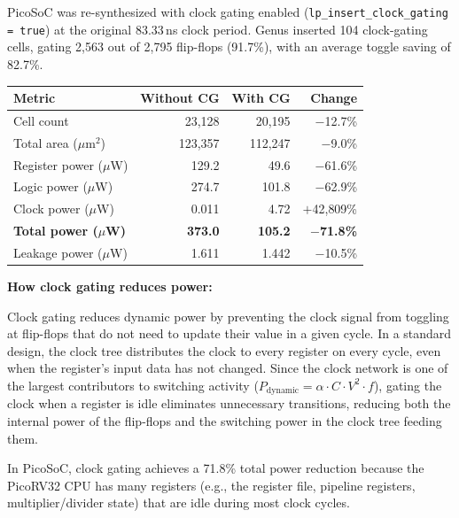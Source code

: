 \documentclass{article}
\begin{document}
\begin{tcolorbox}[colback=white, colframe=black, width=\textwidth, title=Answer 2.3]

PicoSoC was re-synthesized with clock gating enabled (\texttt{lp\_insert\_clock\_gating = true}) at the original 83.33\,ns clock period. Genus inserted 104 clock-gating cells, gating 2{,}563 out of 2{,}795 flip-flops (91.7\%), with an average toggle saving of 82.7\%.

\vspace{0.2cm}

\begin{tabular}{@{}lrrr@{}}
\toprule
\textbf{Metric} & \textbf{Without CG} & \textbf{With CG} & \textbf{Change} \\
\midrule
Cell count & 23{,}128 & 20{,}195 & $-$12.7\% \\
Total area ($\mu$m$^2$) & 123{,}357 & 112{,}247 & $-$9.0\% \\
\midrule
Register power ($\mu$W) & 129.2 & 49.6 & $-$61.6\% \\
Logic power ($\mu$W) & 274.7 & 101.8 & $-$62.9\% \\
Clock power ($\mu$W) & 0.011 & 4.72 & $+$42{,}809\% \\
\textbf{Total power ($\mu$W)} & \textbf{373.0} & \textbf{105.2} & \textbf{$-$71.8\%} \\
\midrule
Leakage power ($\mu$W) & 1.611 & 1.442 & $-$10.5\% \\
\bottomrule
\end{tabular}

\vspace{0.3cm}

\textbf{How clock gating reduces power:}

Clock gating reduces dynamic power by preventing the clock signal from toggling at flip-flops that do not need to update their value in a given cycle. In a standard design, the clock tree distributes the clock to every register on every cycle, even when the register's input data has not changed. Since the clock network is one of the largest contributors to switching activity ($P_{\text{dynamic}} = \alpha \cdot C \cdot V^2 \cdot f$), gating the clock when a register is idle eliminates unnecessary transitions, reducing both the internal power of the flip-flops and the switching power in the clock tree feeding them.

In PicoSoC, clock gating achieves a 71.8\% total power reduction because the PicoRV32 CPU has many registers (e.g., the register file, pipeline registers, multiplier/divider state) that are idle during most clock cycles.


\end{tcolorbox}
\end{document}
